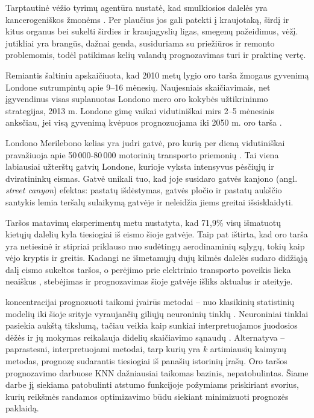 \documentclass[]{VUMIFTemplateClass}
\begin{document}
    Tarptautinė vėžio tyrimų agentūra nustatė, kad smulkiosios  dalelės yra kancerogeniškos žmonėms \cite{iarc2016}.
    Per plaučius jos gali patekti į kraujotaką, širdį ir kitus organus bei sukelti širdies ir kraujagyslių ligas, smegenų pažeidimus, vėžį.
     jutikliai yra brangūs, dažnai genda, susiduriama su priežiūros ir remonto problemomis, todėl patikimas kelių valandų prognozavimas turi ir praktinę vertę.

    Remiantis šaltiniu \cite{walton2015} apskaičiuota, kad 2010 metų lygio oro tarša žmogaus gyvenimą Londone sutrumpintų apie 9--16 mėnesių.
    Naujesniais skaičiavimais, net įgyvendinus visas suplanuotas Londono mero oro kokybės užtikrininmo strategijas, 2013 m. Londone gimę vaikai vidutiniškai mirs 2--5 mėnesiais anksčiau, jei visą gyvenimą kvėpuos prognozuojama iki 2050 m. oro tarša \cite{DEK21}.

    Londono Merilebono kelias yra judri gatvė, pro kurią per dieną vidutiniškai pravažiuoja apie 50\,000-80\,000 motorinių transporto priemonių \cite{DfT26}.
    Tai viena labiausiai užterštų gatvių Londone, kurioje vyksta intensyvus pėsčiųjų ir dviratininkų eismas.
    Gatvė unikali tuo, kad joje susidaro gatvės kanjono (angl. \textit{street canyon}) efektas: pastatų išdėstymas, gatvės pločio ir pastatų aukščio santykis lemia teršalų sulaikymą gatvėje ir neleidžia jiems greitai išsisklaidyti.

    Taršos matavimų eksperimentų metu \cite{harrison2012} nustatyta, kad 71{,}9\% visų išmatuotų kietųjų dalelių kyla tiesiogiai iš eismo šioje gatvėje.
    Taip pat ištirta, kad oro tarša yra netiesinė ir stipriai priklauso nuo sudėtingų aerodinaminių sąlygų, tokių kaip vėjo kryptis ir greitis.
    Kadangi ne išmetamųjų dujų kilmės dalelės sudaro didžiąją dalį eismo sukeltos taršos, o perėjimo prie elektrinio transporto poveikis lieka neaiškus \cite{hicks2021},  stebėjimas ir prognozavimas šioje gatvėje išliks aktualus ir ateityje.

     koncentracijai prognozuoti taikomi įvairūs metodai -- nuo klasikinių statistinių modelių iki šioje srityje vyraujančių giliųjų neuroninių tinklų \cite{wu2025}.
    Neuroniniai tinklai pasiekia aukštą tikslumą, tačiau veikia kaip sunkiai interpretuojamos juodosios dėžės ir jų mokymas reikalauja didelių skaičiavimo sąnaudų \cite{wu2025}.
    Alternatyva -- paprastesni, interpretuojami metodai, tarp kurių yra $k$ artimiausių kaimynų metodas, prognozę sudarantis tiesiogiai iš panašių istorinių įrašų.
    Oro taršos prognozavimo darbuose KNN dažniausiai taikomas bazinis, nepatobulintas.
    Šiame darbe jį siekiama patobulinti atstumo funkcijoje požymiams priskiriant svorius, kurių reikšmės randamos optimizavimo būdu siekiant minimizuoti prognozės paklaidą.
\end{document}
